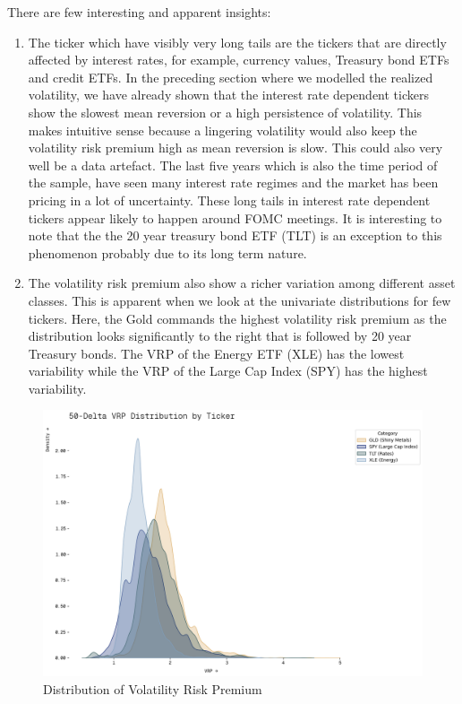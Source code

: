 There are few interesting and apparent insights:
\begin{enumerate}
    \item The ticker which have visibly very long tails are the tickers that are directly affected by interest rates, for example, currency values,  Treasury bond ETFs and credit ETFs.  In the preceding section where we modelled the realized volatility, we have already shown that the interest rate dependent tickers show the slowest mean reversion or a high persistence of volatility. This makes intuitive sense because a lingering volatility would also keep the volatility risk premium high as mean reversion is slow. This could also very well be a data artefact. The last five years which is also the time period of the sample, have seen many interest rate regimes and the market has been pricing in a lot of uncertainty.  These long tails in interest rate dependent tickers appear likely to happen around FOMC meetings. It is interesting to note that the the 20 year treasury bond ETF (TLT) is an exception to this phenomenon probably due to its long term nature.
    \item The volatility risk premium also show a richer variation among different asset classes. This is apparent when we look at the univariate distributions for few tickers. Here, the Gold commands the highest volatility risk premium as the distribution looks significantly to the right that is followed by 20 year Treasury bonds. The VRP of the Energy ETF (XLE) has the lowest variability while the VRP of the Large Cap Index (SPY) has the highest variability. 
\end{enumerate}

\begin{figure}[H]
    \centering
    \includegraphics[width=1\textwidth]{images/kde_vrp_atm.png}
    \caption{Distribution of Volatility Risk Premium}
    \label{fig:kde_vrp_violin}
\end{figure}


